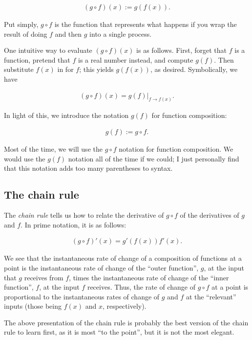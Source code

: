 \begin{align*}
    (g \circ f)(x) := g(f(x)).
\end{align*}
 
Put simply, $g \circ f$ is the function that represents what happens if you wrap the result of doing $f$ and then $g$ into a single process.

One intuitive way to evaluate $(g \circ f)(x)$ is as follows. First, forget that $f$ is a function, pretend that $f$ is a real number instead, and compute $g(f)$. Then substitute $f(x)$ in for $f$; this yields $g(f(x))$, as desired. Symbolically, we have

\begin{align*}
    (g \circ f)(x) = g(f)|_{f \rightarrow f(x)}.
\end{align*}

In light of this, we introduce the notation $g(f)$ for function composition:

\begin{align*}
    g(f) := g \circ f.
\end{align*}

Most of the time, we will use the $g \circ f$ notation for function composition. We would use the $g(f)$ notation all of the time if we could; I just personally find that this notation adds too many parentheses to syntax.

\subsection*{The chain rule}

The \textit{chain rule} tells us how to relate the derivative of $g \circ f$ of the derivatives of $g$ and $f$. In prime notation, it is as follows:

\begin{align*}
    (g \circ f)'(x) = g'(f(x)) f'(x).
\end{align*}

We see that the instantaneous rate of change of a composition of functions at a point is the instantaneous rate of change of the ``outer function'', $g$, at the input that $g$ receives from $f$, times the instantaneous rate of change of the ``inner function'', $f$, at the input $f$ receives. Thus, the rate of change of $g \circ f$ at a point is proportional to the instantaneous rates of change of $g$ and $f$ at the ``relevant'' inputs (those being $f(x)$ and $x$, respectively).

The above presentation of the chain rule is probably the best version of the chain rule to learn first, as it is most ``to the point'', but it is not the most elegant.

